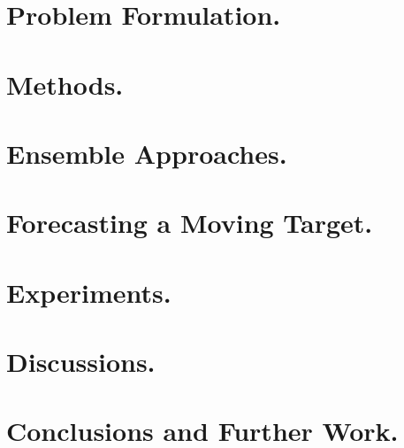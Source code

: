 \documentclass[twoside,leqno,twocolumn]{article}
\begin{document}
\section{\label{sec:problem} Problem Formulation.}

 
\section{\label{sec:methods} Methods.}


\section{Ensemble Approaches.}


\section{Forecasting a Moving Target.}


\section{Experiments.}


\section{Discussions.}


\section{Conclusions and Further Work.}












\end{document}
